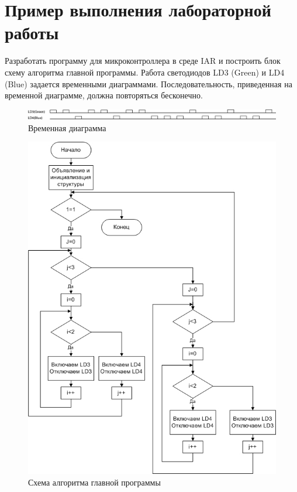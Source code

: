 \section{Пример выполнения лабораторной работы }
Разработать программу для микроконтроллера в среде IAR и построить блок схему алгоритма главной программы. Работа светодиодов LD3 (Green) и LD4 (Blue) задается временными диаграммами. Последовательность, приведенная на временной диаграмме, должна повторяться бесконечно.
\begin{figure}[H]
\begin{center}
\includegraphics[scale=0.3]{Image/77.jpg} 
\end{center}
\caption{Временная диаграмма}
\end{figure}

\begin{figure}[H]
\begin{center}
\includegraphics[scale=0.6]{Image/78.jpg} 
\end{center}
\caption{Схема алгоритма главной программы}
\end{figure}

